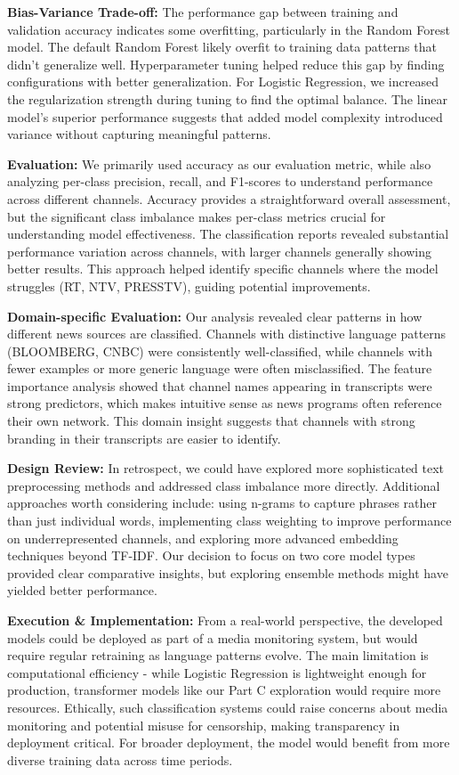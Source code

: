 \documentclass[11pt]{article}
\begin{document}
\textbf{Bias-Variance Trade-off:} The performance gap between training and validation accuracy indicates some overfitting, particularly in the Random Forest model. The default Random Forest likely overfit to training data patterns that didn't generalize well. Hyperparameter tuning helped reduce this gap by finding configurations with better generalization. For Logistic Regression, we increased the regularization strength during tuning to find the optimal balance. The linear model's superior performance suggests that added model complexity introduced variance without capturing meaningful patterns.

\textbf{Evaluation:} We primarily used accuracy as our evaluation metric, while also analyzing per-class precision, recall, and F1-scores to understand performance across different channels. Accuracy provides a straightforward overall assessment, but the significant class imbalance makes per-class metrics crucial for understanding model effectiveness. The classification reports revealed substantial performance variation across channels, with larger channels generally showing better results. This approach helped identify specific channels where the model struggles (RT, NTV, PRESSTV), guiding potential improvements.

\textbf{Domain-specific Evaluation:} Our analysis revealed clear patterns in how different news sources are classified. Channels with distinctive language patterns (BLOOMBERG, CNBC) were consistently well-classified, while channels with fewer examples or more generic language were often misclassified. The feature importance analysis showed that channel names appearing in transcripts were strong predictors, which makes intuitive sense as news programs often reference their own network. This domain insight suggests that channels with strong branding in their transcripts are easier to identify.

\textbf{Design Review:} In retrospect, we could have explored more sophisticated text preprocessing methods and addressed class imbalance more directly. Additional approaches worth considering include: using n-grams to capture phrases rather than just individual words, implementing class weighting to improve performance on underrepresented channels, and exploring more advanced embedding techniques beyond TF-IDF. Our decision to focus on two core model types provided clear comparative insights, but exploring ensemble methods might have yielded better performance.

\textbf{Execution \& Implementation:} From a real-world perspective, the developed models could be deployed as part of a media monitoring system, but would require regular retraining as language patterns evolve. The main limitation is computational efficiency - while Logistic Regression is lightweight enough for production, transformer models like our Part C exploration would require more resources. Ethically, such classification systems could raise concerns about media monitoring and potential misuse for censorship, making transparency in deployment critical. For broader deployment, the model would benefit from more diverse training data across time periods.
\end{document}
